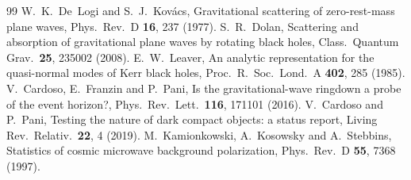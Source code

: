 \documentclass[11pt,a4paper]{article}
\numberwithin{equation}{section}
\begin{document}
\begin{thebibliography}{99}
 W.~K.~De~Logi and S.~J.~Kov\'acs, Gravitational scattering of zero-rest-mass plane waves, Phys.\ Rev.\ D \textbf{16}, 237 (1977).
 S.~R.~Dolan, Scattering and absorption of gravitational plane waves by rotating black holes, Class.\ Quantum Grav.\ \textbf{25}, 235002 (2008).
 E.~W.~Leaver, An analytic representation for the quasi-normal modes of Kerr black holes, Proc.\ R.\ Soc.\ Lond.\ A \textbf{402}, 285 (1985).
 V.~Cardoso, E.~Franzin and P.~Pani, Is the gravitational-wave ringdown a probe of the event horizon?, Phys.\ Rev.\ Lett.\ \textbf{116}, 171101 (2016).
 V.~Cardoso and P.~Pani, Testing the nature of dark compact objects: a status report, Living Rev.\ Relativ.\ \textbf{22}, 4 (2019).
 M.~Kamionkowski, A.~Kosowsky and A.~Stebbins, Statistics of cosmic microwave background polarization, Phys.\ Rev.\ D \textbf{55}, 7368 (1997).
\end{thebibliography}
\end{document}
